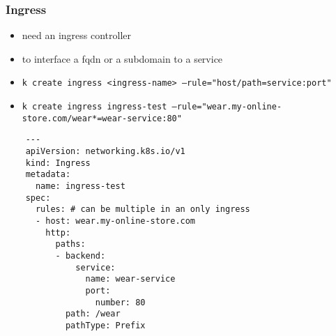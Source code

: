 
\subsubsection{Ingress}
\begin{frame}[fragile]{\subsubsecname}
  \begin{itemize}
    \item need an ingress controller
    \item to interface a fqdn or a subdomain to a service
    \item \texttt{k create ingress <ingress-name> --rule="host/path=service:port"}
    \item \texttt{k create ingress ingress-test --rule="wear.my-online-store.com/wear*=wear-service:80"}
  \end{itemize}
  \begin{lstlisting}
    ---
    apiVersion: networking.k8s.io/v1
    kind: Ingress
    metadata:
      name: ingress-test
    spec:
      rules: # can be multiple in an only ingress
      - host: wear.my-online-store.com
        http:
          paths:
          - backend:
              service:
                name: wear-service
                port:
                  number: 80
            path: /wear
            pathType: Prefix
  \end{lstlisting}
\end{frame}
